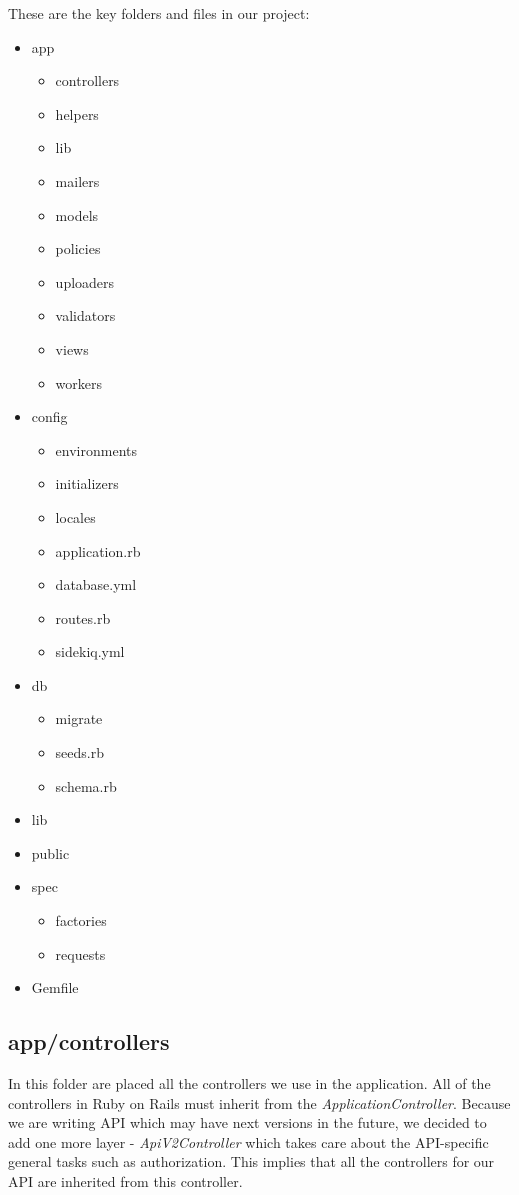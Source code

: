 	These are the key folders and files in our project: 
	\begin{itemize}
		\item app
			\begin{itemize}
				\item controllers
				\item helpers
				\item lib
				\item mailers
				\item models
				\item policies
				\item uploaders
				\item validators
				\item views
				\item workers
			\end{itemize}
		\item config \begin{itemize}
			\item environments
			\item initializers
			\item locales
			\item application.rb
			\item database.yml
			\item routes.rb
			\item sidekiq.yml
		\end{itemize}
		\item db \begin{itemize}
			\item migrate
			\item seeds.rb
			\item schema.rb
		\end{itemize}
		\item lib
		\item public
		\item spec \begin{itemize}
			\item factories
			\item requests
		\end{itemize}
		\item Gemfile
	\end{itemize}

	\subsection{app/controllers}
		In this folder are placed all the controllers we use in the application. All of the controllers in Ruby on Rails must inherit from the \textit{ApplicationController}. Because we are writing API which may have next versions in the future, we decided to add one more layer - \textit{ApiV2Controller} which takes care about the API-specific general tasks such as authorization. This implies that all the controllers for our API are inherited from this controller.
		
